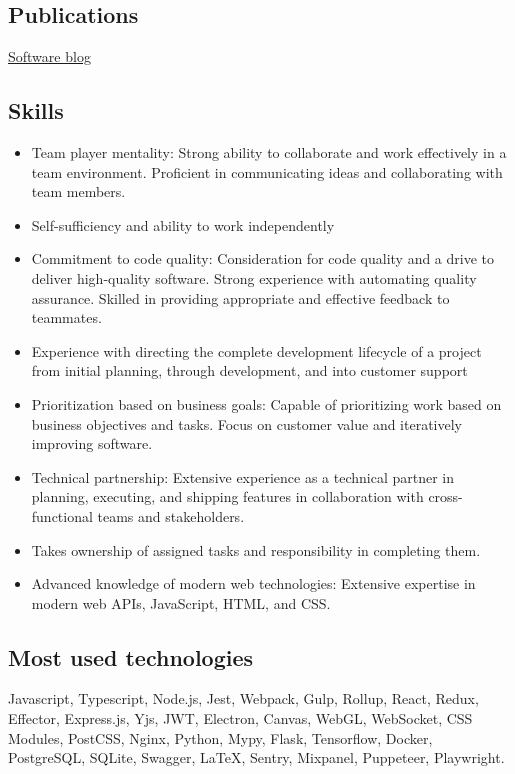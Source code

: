 \documentclass{vitonsky}
\begin{document}
\subsection*{Publications}

\href{https://vitonsky.net}{Software blog}

\subsection*{Skills}

\begin{itemize}
\item
  Team player mentality: Strong ability to collaborate and work effectively in a team environment. Proficient in communicating ideas and collaborating with team members.
\item
  Self-sufficiency and ability to work independently
\item
  Commitment to code quality: Consideration for code quality and a drive to deliver high-quality software. Strong experience with automating quality assurance. Skilled in providing appropriate and effective feedback to teammates.
\item
  Experience with directing the complete development lifecycle of a project from initial planning, through development, and into customer support
\item
  Prioritization based on business goals: Capable of prioritizing work based on business objectives and tasks. Focus on customer value and iteratively improving software.
\item
  Technical partnership: Extensive experience as a technical partner in planning, executing, and shipping features in collaboration with cross-functional teams and stakeholders.
\item
  Takes ownership of assigned tasks and responsibility in completing them.
\item
  Advanced knowledge of modern web technologies: Extensive expertise in modern web APIs, JavaScript, HTML, and CSS.
\end{itemize}

\subsection*{Most used technologies}

Javascript, Typescript, Node.js, Jest, Webpack, Gulp, Rollup,
React, Redux, Effector, Express.js, Yjs, JWT, Electron, Canvas, WebGL, WebSocket, CSS Modules, PostCSS,
Nginx, Python, Mypy, Flask, Tensorflow, Docker, PostgreSQL, SQLite, Swagger, LaTeX,
Sentry, Mixpanel, Puppeteer, Playwright.
\end{document}
